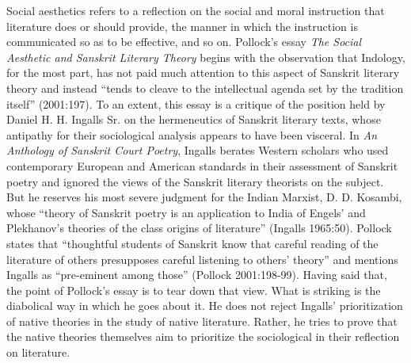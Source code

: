 Social aesthetics refers to a reflection on the social and moral instruction that literature does or should provide, the manner in which the instruction is communicated so as to be effective, and so on. Pollock's essay \textsl{The Social Aesthetic and Sanskrit Literary Theory} begins with the observation that Indology, for the most part, has not paid much attention to this aspect of Sanskrit literary theory and instead ``tends to cleave to the intellectual agenda set by the tradition itself'' (2001:197). To an extent, this essay is a critique of the position held by Daniel H. H. Ingalls Sr. on the hermeneutics of Sanskrit literary texts, whose antipathy for their sociological analysis appears to have been visceral. In \textsl{An Anthology of Sanskrit Court Poetry}, Ingalls berates Western scholars who used contemporary European and American standards in their assessment of Sanskrit poetry and ignored the views of the Sanskrit literary theorists on the subject. But he reserves his most severe judgment for the Indian Marxist, D. D. Kosambi, whose ``theory of Sanskrit poetry is an application to India of Engels' and Plekhanov's theories of the class origins of literature'' (Ingalls 1965:50). Pollock states that ``thoughtful students of Sanskrit know that careful reading of the literature of others presupposes careful listening to others' theory'' and mentions Ingalls as ``pre-eminent among those'' (Pollock 2001:198-99). Having said that, the point of Pollock's essay is to tear down that view. What is striking is the diabolical way in which he goes about it. He does not reject Ingalls' prioritization of native theories in the study of native literature. Rather, he tries to prove that the native theories themselves aim to prioritize the sociological in their reflection on literature.

